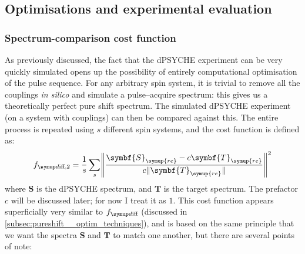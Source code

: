 \subsection{Optimisations and experimental evaluation}
\label{subsec:pureshift__dpsyche_optimisation}


\subsubsection{Spectrum-comparison cost function}

As previously discussed, the fact that the dPSYCHE experiment can be very quickly simulated opens up the possibility of entirely computational optimisation of the pulse sequence.
For any arbitrary spin system, it is trivial to remove all the couplings \textit{in silico} and simulate a pulse--acquire spectrum: this gives us a theoretically perfect pure shift spectrum.
The simulated dPSYCHE experiment (on a system with couplings) can then be compared against this.
The entire process is repeated using $s$ different spin systems, and the cost function is defined as:
\begin{equation}
    \label{eq:f_diff_dpsyche}
    \fdifftwo = \frac{1}{s}\sum_s \Biggl\lVert \frac{\symbf{S}_{\symup{re}} - c\symbf{T}_{\symup{re}}}{c\lVert \symbf{T}_{\symup{re}} \rVert} \Biggr\rVert^2
\end{equation}
where $\symbf{S}$ is the dPSYCHE spectrum, and $\symbf{T}$ is the target spectrum.
The prefactor $c$ will be discussed later; for now I treat it as $1$.
This cost function appears superficially very similar to $\fdiff$ (discussed in \cref{subsec:pureshift__optim_techniques}), and is based on the same principle that we want the spectra $\symbf{S}$ and $\symbf{T}$ to match one another, but there are several points of note:
